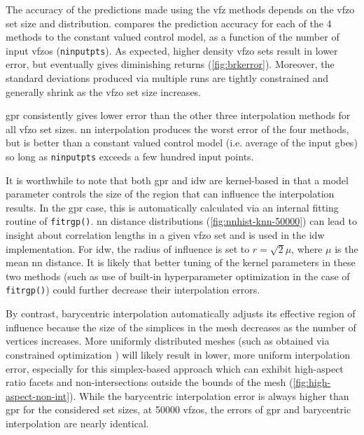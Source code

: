 \documentclass[final,twocolumn,12pt]{elsarticle}
\newcommand{\inpt}{input}
\newcommand{\inptvar}{ninputpts}
\begin{document}
{The accuracy of the predictions made using the \gls{vfz} methods depends on the \gls{vfzo} set size and distribution. %
 compares the prediction accuracy for each of the 4 methods to the constant valued control model, as a function of the number of \inpt{} \glspl{vfzo} (\texttt{\inptvar{}}). As expected, higher density \gls{vfzo} sets result in lower error, but eventually gives diminishing returns (\cref{fig:brkerror}). Moreover, the standard deviations produced via multiple runs are tightly constrained and generally shrink as the \gls{vfzo} set size increases. 

\Gls{gpr} consistently gives lower error than the other three interpolation methods for all \gls{vfzo} set sizes. 
\Gls{nn} interpolation produces the worst error of the four methods, but is better than a constant valued control model (i.e. average of the \inpt{} \glspl{gbe}) so long as \texttt{\inptvar{}} exceeds a few hundred \inpt{} points.

It is worthwhile to note that both \gls{gpr} and \gls{idw} are kernel-based in that a model parameter controls the size of the region that can influence the interpolation results. In the \gls{gpr} case, this is automatically calculated via an internal fitting routine of \texttt{fitrgp()}. \gls{nn} distance distributions (\cref{fig:nnhist-knn-50000}) can lead to insight about correlation lengths in a given \gls{vfzo} set and is used in the \gls{idw} implementation. For \gls{idw}, the radius of influence is set to $r=\sqrt{2} \mu$, where $\mu$ is the mean \gls{nn} distance. It is likely that better tuning of the kernel parameters in these two methods (such as use of built-in hyperparameter optimization in the case of \texttt{fitrgp()}) could further decrease their interpolation errors.

By contrast, barycentric interpolation automatically adjusts its effective region of influence because the size of the simplices in the mesh decreases as the number of vertices increases. More uniformly distributed meshes (such as obtained via constrained optimization \cite{dolanBenchmarkingOptimizationSoftware2004,ConstrainedElectrostaticNonlinear2020}) will likely result in lower, more uniform interpolation error, especially for this simplex-based approach which can exhibit high-aspect ratio facets and non-intersections outside the bounds of the mesh (\cref{fig:high-aspect-non-int}). While the barycentric interpolation error is always higher than \gls{gpr} for the considered set sizes, at \num{50000} \glspl{vfzo}, the errors of \gls{gpr} and barycentric interpolation are nearly identical. %

}
\end{document}
